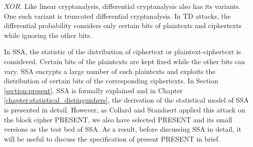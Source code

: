 $XOR$. Like linear cryptanalysis, differential cryptanalysis also has its variants. One such variant is truncated differential cryptanalysis. In TD attacks, the differential probability considers only certain bits of plaintexts and ciphertexts while ignoring the other bits. \par \noindent In SSA, the statistic of the distribution of ciphertext or plaintext-ciphertext is considered. Certain bits of the plaintexts are kept fixed while the other bits can vary. SSA encrypts a large number of such plaintexts and exploits the distribution of certain bits of the corresponding ciphertexts. In Section \ref{section:present}, SSA is formally explained  and in Chapter \ref{chapter:statistical_distinguishers}, the derivation of the statistical model of SSA is presented in detail. However, as Collard and Standaert applied this attack on the block cipher PRESENT, we also have selected PRESENT and its small versions \citep{smalpresent} as the test bed of SSA. As a result, before discussing SSA in  detail, it will be useful to discuss the specification of present PRESENT in brief.


